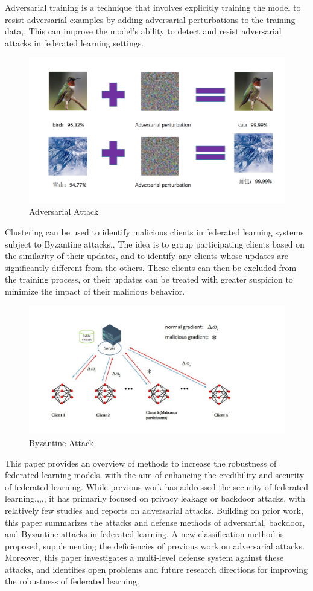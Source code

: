 \documentclass[conference]{IEEEtran}
\begin{document}
Adversarial training is a technique that involves explicitly training the model to resist adversarial examples 
by adding adversarial perturbations to the training data\cite{b31},\cite{b32}.  
This can improve the model's ability to detect and resist adversarial attacks in federated learning settings.  
\begin{figure}[htbp]
    \centerline{\includegraphics[width=0.8\linewidth,height=0.4\linewidth]{picture/f2.png}}
    \caption{Adversarial Attack}
    \label{fig4}
\end{figure}
Clustering can be used to identify malicious clients in federated learning systems subject to Byzantine attacks\cite{b35},\cite{b36}. 
The idea is to group participating clients based on the similarity of their updates, and to identify any clients whose updates are significantly different from the others. 
These clients can then be excluded from the training process, or their updates can be treated with greater suspicion to minimize the impact of their malicious behavior\cite{b37}.  
\begin{figure}[htbp]
    \centerline{\includegraphics[width=0.8\linewidth,height=0.4\linewidth]{picture/f5.jpg}}
    \caption{Byzantine Attack}
    \label{fig5}
\end{figure}
This paper provides an overview of methods to increase the robustness of federated learning models, with the aim of enhancing the credibility and security of federated learning. 
While previous work has addressed the security of federated learning\cite{b39},\cite{b40},\cite{b41},\cite{b42},\cite{b43}, it has primarily focused on privacy leakage or backdoor attacks, 
with relatively few studies and reports on adversarial attacks. Building on prior work, this paper summarizes the attacks and defense methods of adversarial, backdoor, 
and Byzantine attacks in federated learning. A new classification method is proposed, supplementing the deficiencies of previous work on adversarial attacks. 
Moreover, this paper investigates a multi-level defense system against these attacks, and identifies open problems and future research directions for improving 
the robustness of federated learning.
\end{document}
